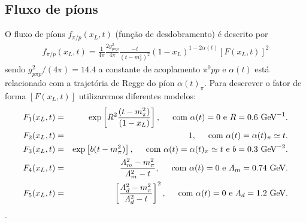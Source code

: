 \documentclass[a4paper,12pt]{article} %
\begin{document}
\subsection{Fluxo de píons}
O fluxo de píons $f_{\pi/p}(x_L, t)$ (função de desdobramento)
é descrito por
\begin{eqnarray}
  f_{\pi/p} (x_L,t)  = 
  \frac{1}{4 \pi} \frac{2 g_{p \pi p}^2}{4  \pi} 
  \frac{-t}{(t-m_{\pi}^2)^2} (1-x_L)^{1-2 \alpha(t)}  
  [F(x_L,t)]^2
\end{eqnarray}
sendo $g_{p \pi p}^2/(4\pi)=14.4$ a constante de acoplamento
$\pi^0pp$ e $\alpha(t)$ está relacionado com a trajetória 
de Regge do píon $\alpha(t)_{\pi}$.
Para descrever o fator de forma $[F(x_L,t)]$ utilizaremos diferentes modelos:
\begin{eqnarray}
  F_1(x_L,t) &=& \exp \left[ R^2 \frac{(t-m_{\pi}^2)}{(1-x_L)} \right], 
  \hspace{0.5cm} \text{com } \alpha(t) = 0 
  \text{ e } R = 0.6 \text{ GeV}^{-1}.\\
  F_2(x_L,t) &=& 1, 
  \hspace{0.5cm} \text{com } \alpha(t) = \alpha(t)_{\pi} \simeq t.\\
  F_3(x_L,t) &=& \exp \left[ b (t-m_{\pi}^2) \right],
  \hspace{0.5cm} \text{com } \alpha(t) = \alpha(t)_{\pi} \simeq t
  \text{ e } b = 0.3 \text{ GeV}^{-2}.\\
  F_4(x_L,t) &=& \frac{\Lambda_m^2-m_{\pi}^2}{\Lambda_m^2-t},
  \hspace{0.5cm} \text{com } \alpha(t) = 0 
  \text{ e } \Lambda_m = 0.74 \text{ GeV}.\\
  F_5(x_L,t) &=& \left[\frac{\Lambda_d^2-m_{\pi}^2}{\Lambda_d^2-t}\right]^2,
  \hspace{0.5cm} \text{com } \alpha(t) = 0 
  \text{ e } \Lambda_d = 1.2 \text{ GeV}.\\ 
\end{eqnarray}.  
\end{document}
